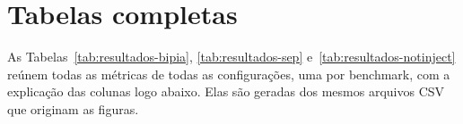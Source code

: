 \section{Tabelas completas}\label{sec:res_tabelas}

As Tabelas~\ref{tab:resultados-bipia}, \ref{tab:resultados-sep}
e~\ref{tab:resultados-notinject} reúnem todas as métricas de todas as
configurações, uma por benchmark, com a explicação das colunas logo abaixo.
Elas são geradas dos mesmos arquivos CSV que originam as figuras.




